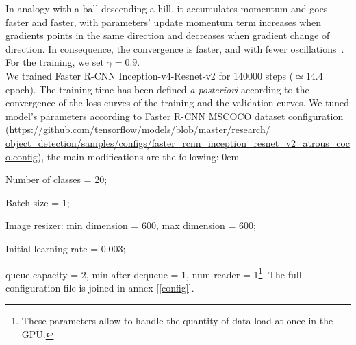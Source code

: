 \documentclass[12pt, french, a4paper]{article} %
\let\tempone\itemize
\let\temptwo\enditemize
\renewenvironment{itemize}{\tempone\addtolength{\itemsep}{-0.3\baselineskip}}{\temptwo}
\newcommand{\link}[1]{{\color{Blue}\scriptsize\href{#1}{#1}}}
\begin{document}
In analogy with a ball descending a hill, it accumulates momentum and goes faster and faster, with parameters' update momentum term increases when gradients points in the same direction and decreases when gradient change of direction. In consequence, the convergence is faster, and with fewer oscillations \cite{ruder2016overview}. For the training, we set $\gamma = 0.9$.\\
We trained Faster \gls{R-CNN} Inception-v4-Resnet-v2 for 140000 steps ($\simeq 14.4$ epoch). The training time has been defined \textit{a posteriori} according to the convergence of the loss curves of the training and the validation curves. We tuned model's parameters according to Faster \gls{R-CNN} MSCOCO dataset \cite{lin2014microsoft} configuration (\link{https://github.com/tensorflow/models/blob/master/research/\\object_detection/samples/configs/faster_rcnn_inception_resnet_v2_atrous_coco.config}), the main modifications are the following:
\begin{itemize}
\itemsep0em 
 \item Number of classes = 20;
 \item Batch size = 1;
 \item Image resizer: min dimension = 600, max dimension = 600;
 \item Initial learning rate = 0.003;
 \item queue capacity = 2, min after dequeue = 1, num reader = 1\footnote{These parameters allow to handle the quantity of data load at once in the GPU.}.
\end{itemize}
The full configuration file is joined in annex [\ref{config}].
\end{document}
